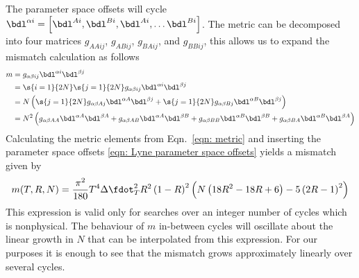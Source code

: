 The parameter
space offsets will cycle $\bdl^{\alpha i} = \left[\bdl^{A i}, \bdl^{B i}, \bdl^{A i}, \dots \bdl^{Bi}\right]$.
The metric can be decomposed into four matrices $g_{AAij}$, $g_{ABij}$, $g_{BAij}$, and $g_{BBij}$, this
allows us to expand the mismatch calculation as follows
\begin{align}
m & = g_{\alpha \beta i j} \bdl^{\alpha i} \bdl^{\beta j} \\
& = \s{i=1}{2N}\s{j=1}{2N} g_{\alpha \beta i j} \bdl^{\alpha i} \bdl^{\beta j} \\
& = N\left(\s{j=1}{2N} g_{\alpha \beta A j} \bdl^{\alpha A} \bdl^{\beta j} + \s{j=1}{2N} g_{\alpha \beta B j} \bdl^{\alpha B} \bdl^{\beta j} \right) \\
& = N^{2}\left(g_{\alpha\beta AA} \bdl^{\alpha A} \bdl^{\beta A} + g_{\alpha \beta AB} \bdl^{\alpha A} \bdl^{\beta B} + g_{\alpha \beta BB} \bdl^{\alpha B} \bdl^{\beta B} + g_{\alpha\beta BA} \bdl^{\alpha B} \bdl^{\beta A}  \right)
\end{align}
Calculating the metric elements from Eqn.~\eqref{eqn: metric} and inserting the parameter space offsets
\eqref{eqn: Lyne parameter space offsets} yields a mismatch given by
\begin{equation}
m(T, R, N) = \frac{\pi^{2}}{180}T^{4}\dST^{2} R^{2}\left(1-R\right)^{2} \left(N \left(18 R^{2} - 18 R + 6\right) - 5 \left(2 R - 1\right)^{2}\right)
\end{equation}
This expression is valid only for searches over an integer number of cycles which is nonphysical.
The behaviour of $m$ in-between cycles will oscillate about the linear growth in $N$ that 
can be interpolated from this expression. For our purposes it is enough to see that the mismatch 
grows approximately linearly over several cycles. 
